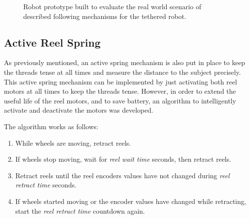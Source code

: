 \documentclass[journal]{IEEEtran}
\begin{document}
\begin{figure}[!t]
\centering
{}
\caption{Robot prototype built to evaluate the real world scenario of described following mechanisms for the tethered robot.}
\label{fig:p300templates}
\end{figure}

\subsection{Active Reel Spring}

As previously mentioned, an active spring mechanism is also put in place to keep the threads tense at all times and measure the distance to the subject precisely. This active spring mechanism can be implemented by just activating both reel motors at all times to keep the threads tense. However, in order to extend the useful life of the reel motors, and to save battery, an algorithm to intelligently activate and deactivate the motors was developed. 

The algorithm works as follows: 

\begin{enumerate}
    \item While wheels are moving, retract reels.
    \item If wheels stop moving, wait for \textit{reel wait time} seconds, then retract reels. 
    \item Retract reels until the reel encoders values have not changed during \textit{reel retract time} seconds.
    \item If wheels started moving or the encoder values have changed while retracting, start the \textit{reel retract time} countdown again.
\end{enumerate}{}
\end{document}
